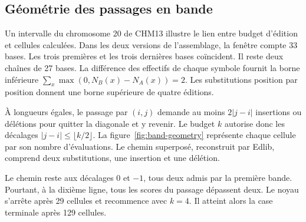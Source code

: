 \subsection{Géométrie des passages en bande}\label{sec:band-geometry}

Un intervalle du chromosome 20 de CHM13 illustre le lien entre budget d’édition et cellules calculées. Dans les deux versions de l’assemblage, la fenêtre compte 33 bases. Les trois premières et les trois dernières bases coïncident. Il reste deux chaînes de 27 bases. La différence des effectifs de chaque symbole fournit la borne inférieure \(\sum_x\max(0,N_B(x)-N_A(x))=2\). Les substitutions position par position donnent une borne supérieure de quatre éditions.

À longueurs égales, le passage par \((i,j)\) demande au moins \(2|j-i|\) insertions ou délétions pour quitter la diagonale et y revenir. Le budget \(k\) autorise donc les décalages \(|j-i|\leq\lfloor k/2\rfloor\). La figure~\ref{fig:band-geometry} représente chaque cellule par son nombre d’évaluations. Le chemin superposé, reconstruit par Edlib, comprend deux substitutions, une insertion et une délétion.


\FloatBarrier
{}
Le chemin reste aux décalages \(0\) et \(-1\), tous deux admis par la première bande. Pourtant, à la dixième ligne, tous les scores du passage dépassent deux. Le noyau s’arrête après 29 cellules et recommence avec \(k=4\). Il atteint alors la case terminale après 129 cellules.

